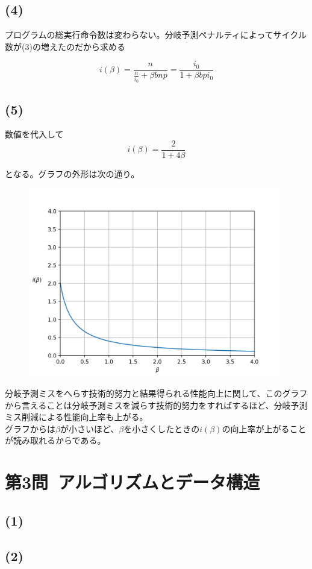 \documentclass[a4paper,12pt,xelatex,ja=standard]{bxjsarticle}
\begin{document}
\subsection*{(4)}
プログラムの総実行命令数は変わらない。分岐予測ペナルティによってサイクル数が(3)の増えたのだから求める

\[
  i(\beta) = \frac{n}{\frac{n}{i_0} + \beta bnp} = \frac{i_0}{1 + \beta b p i_0}
\]

\subsection*{(5)}
数値を代入して
\[
  i(\beta) = \frac{2}{1 + 4 \beta}
\]

となる。グラフの外形は次の通り。

\begin{figure}[H]
  \centering
  \includegraphics[width=11cm]{images/2010_2.png}
\end{figure}

分岐予測ミスをへらす技術的努力と結果得られる性能向上に関して、このグラフから言えることは分岐予測ミスを減らす技術的努力をすればするほど、分岐予測ミス削減による性能向上率も上がる。\\
グラフからは$\beta$が小さいほど、$\beta$を小さくしたときの$i(\beta)$の向上率が上がることが読み取れるからである。

\section*{第3問\ アルゴリズムとデータ構造}
\subsection*{(1)}

\subsection*{(2)}
\end{document}
